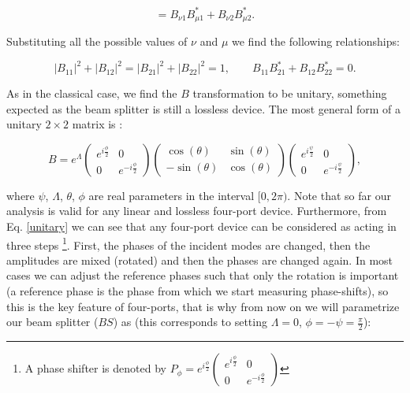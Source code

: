 \documentclass[12pt]{book}
\begin{document}
\begin{equation}
   [\mathbf{a}'_{\nu},\mathbf{a}'^{\dagger}_{\mu}]=B_{\nu 1} B_{\mu 1}^{*}+B_{\nu 2} B_{\mu 2}^{*} .
\end{equation}

Substituting all the possible values of $\nu$ and $\mu$ we find the following relationships:

\begin{equation}
|B_{11}|^{2}+|B_{12}|^{2}=|B_{21}|^{2}+|B_{22}|^{2}=1 ,\qquad B_{11} B_{21}^{*}+B_{12} B_{22}^{*}=0.
\end{equation}

As in the classical case, we find the $B$ transformation to be unitary, something expected as the beam splitter is still a lossless device. The most general form of a unitary $2\times2$ matrix is \cite{leonhardt}:


\begin{equation}
B=e^{\Lambda} \begin{pmatrix} e^{i\frac{\phi}{2}} & 0 \\ 0 & e^{-i\frac{\phi}{2}} \end{pmatrix} \begin{pmatrix} \cos(\theta) &  \sin(\theta) \\ - \sin(\theta) & \cos(\theta) \end{pmatrix} \begin{pmatrix} e^{i\frac{\psi}{2}} & 0 \\ 0 & e^{-i\frac{\psi}{2}} \end{pmatrix} \label{unitary},
\end{equation}

where $\psi$, $\Lambda$, $\theta$, $\phi$ are real parameters in the interval $[0,2\pi)$. Note that so far our analysis is valid for any linear and lossless four-port device. Furthermore, from Eq. \ref{unitary} we can see that any four-port device can be considered as acting in three steps \footnote{A phase shifter is denoted by $P_{\phi}=e^{i \frac{\phi}{2}}\begin{pmatrix}e^{i \frac{\phi}{2}} & 0 \\0 & e^{-i \frac{\phi}{2}} \end{pmatrix}$}. First, the phases of the incident modes are changed, then the amplitudes are mixed (rotated) and then the phases are changed again. In most cases we can adjust the reference phases such that only the rotation is important (a reference phase is the phase from which we start measuring phase-shifts), so this is the key feature of four-ports, that is why from now on we will parametrize our beam splitter ($BS$) as (this corresponds to  setting $\Lambda=0$, $\phi=-\psi=\frac{\pi}{2}$):
\end{document}
